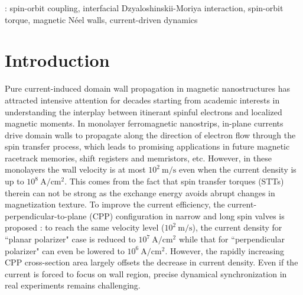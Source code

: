 \documentclass[12pt]{iopart}
\begin{document}
: spin-orbit coupling, interfacial Dzyaloshinskii-Moriya interaction, 
spin-orbit torque, magnetic N\'{e}el walls, current-driven dynamics

\submitto{\NJP}

\maketitle


\section{Introduction}\label{section:introduction}
Pure current-induced domain wall propagation in magnetic nanostructures has attracted intensive
attention for decades starting from academic interests in understanding the interplay between itinerant
spinful electrons and localized magnetic
moments\cite{Berger_PRB_1996,Slonczewski_JMMM_1996,SCZhang_PRB_1998,Zangwill_PRB_2002}.
In monolayer ferromagnetic nanostrips,
in-plane currents drive domain walls to propagate along the direction of electron flow
through the spin transfer process\cite{Tatara_PRL_2004,SZhang_PRL_2004a,SZhang_PRL_2004b,Thiaville_EPL_2005,PYan_EPL_2010,ZZSun_EPJB_2011,
	APL_83_509_2003,PRL_92_077205_2004,PRL_95_026601_2005,AdvPhys_54_585_2005,PRL_98_037204_2007},
which leads to promising applications in future
magnetic racetrack memories\cite{Science_320_190_2008,NatNanotech_10_195_2015},
shift registers\cite{Science_320_209_2008,NatNanotech_7_499_2012}
and memristors\cite{IEEE_30_294_2009,JAP_111_07D303_2012}, etc.
However, in these monolayers the wall velocity is at most $10^2\ \mathrm{m/s}$
even when the current density is up to $10^{8}\ \mathrm{A/cm^2}$.
This comes from the fact that spin transfer torques (STTs) therein
can not be strong as the exchange energy avoids abrupt changes in magnetization texture.
To improve the current efficiency, the current-perpendicular-to-plane (CPP)
configuration in narrow and long spin valves is proposed
\cite{Cros_PRL_2009,Boone_PRL_2010,Cros_NatPhys_2011}:
to reach the same velocity level ($10^2\ \mathrm{m/s}$), the current density
for ``planar polarizer" case is reduced to $10^{7}\ \mathrm{A/cm^2}$ while that for
``perpendicular polarizer" can even be lowered to $10^{6}\ \mathrm{A/cm^2}$.
However, the rapidly increasing CPP cross-section area largely offsets the decrease in current density.
Even if the current is forced to focus on wall region, precise dynamical synchronization in
real experiments remains challenging.
\end{document}
